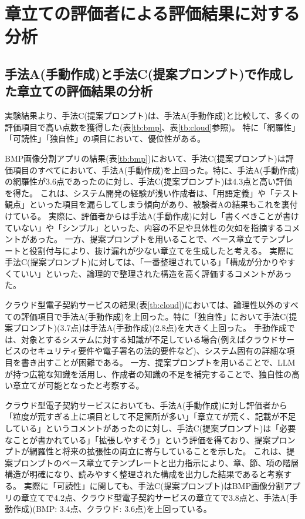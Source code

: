 \section{章立ての評価者による評価結果に対する分析}

\subsection{手法A(手動作成)と手法C(提案プロンプト)で作成した章立ての評価結果の分析}

実験結果より、手法C(提案プロンプト)は、手法A(手動作成)と比較して、多くの評価項目で高い点数を獲得した(表\ref{tb:bmp}、表\ref{tb:cloud}参照)。
特に「網羅性」「可読性」「独自性」の項目において、優位性がある。

BMP画像分割アプリの結果(表\ref{tb:bmp})において、手法C(提案プロンプト)は評価項目のすべてにおいて、手法A(手動作成)を上回った。特に、手法A(手動作成)の網羅性が3.6点であったのに対し、手法C(提案プロンプト)は4.3点と高い評価を得た。
これは、システム開発の経験が浅い作成者は、「用語定義」や「テスト観点」といった項目を漏らしてしまう傾向があり、被験者Aの結果もこれを裏付けている。
実際に、評価者からは手法A(手動作成)に対し「書くべきことが書けていない」や「シンプル」といった、内容の不足や具体性の欠如を指摘するコメントがあった。
一方、提案プロンプトを用いることで、ベース章立てテンプレートと役割付与により、抜け漏れが少ない章立てを生成したと考える。
実際に手法C(提案プロンプト)に対しては、「一番整理されている」「構成が分かりやすくていい」といった、論理的で整理された構造を高く評価するコメントがあった。

クラウド型電子契約サービスの結果(表\ref{tb:cloud})においては、論理性以外のすべての評価項目で手法A(手動作成)を上回った。特に「独自性」において手法C(提案プロンプト)(3.7点)は手法A(手動作成)(2.8点)を大きく上回った。
手動作成では、対象とするシステムに対する知識が不足している場合(例えばクラウドサービスのセキュリティ要件や電子署名の法的要件など)、システム固有の詳細な項目を書き出すことが困難である。
一方、提案プロンプトを用いることで、LLMが持つ広範な知識を活用し、作成者の知識の不足を補完することで、独自性の高い章立てが可能となったと考察する。

クラウド型電子契約サービスにおいても、手法A(手動作成)に対し評価者から「粒度が荒すぎる上に項目として不足箇所が多い」「章立てが荒く、記載が不足している」というコメントがあったのに対し、手法C(提案プロンプト)は「必要なことが書かれている」「拡張しやすそう」という評価を得ており、提案プロンプトが網羅性と将来の拡張性の両立に寄与していることを示した。
これは、提案プロンプトのベース章立てテンプレートと出力指示により、章、節、項の階層構造が明確になり、読みやすく整理された構成を出力した結果であると考察する。
実際に「可読性」に関しても、手法C(提案プロンプト)はBMP画像分割アプリの章立てで4.2点、クラウド型電子契約サービスの章立てで3.8点と、手法A(手動作成)(BMP: 3.4点、クラウド: 3.6点)を上回っている。

